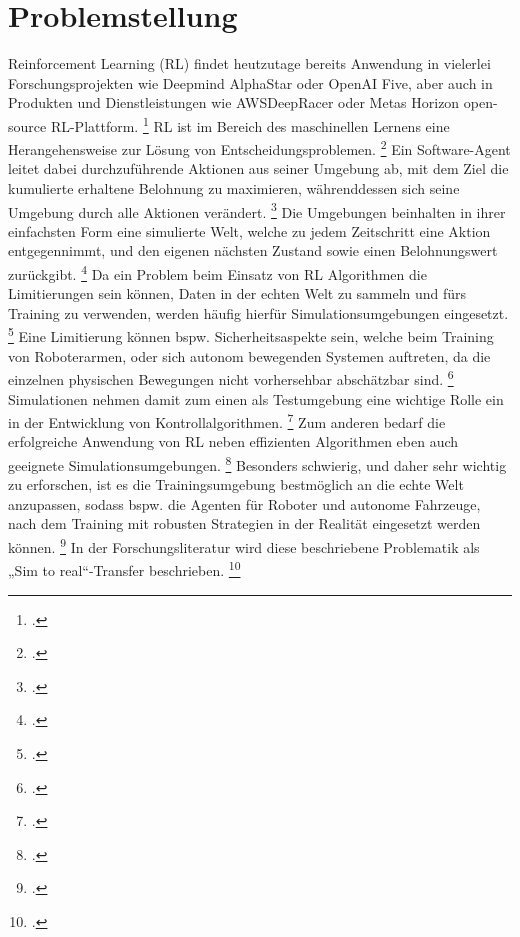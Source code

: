 \section{Problemstellung}

Reinforcement Learning (RL) findet heutzutage bereits Anwendung in vielerlei Forschungsprojekten wie Deepmind AlphaStar oder OpenAI Five, aber auch in Produkten und Dienstleistungen wie AWSDeepRacer oder Metas Horizon open-source RL-Plattform. \footcite[Vgl.][S. 4]{Li.2019}
RL ist im Bereich des maschinellen Lernens eine Herangehensweise zur Lösung von Entscheidungsproblemen. \footcite[Vgl.][S. 3]{Schuderer.2021}
Ein Software-Agent leitet dabei durchzuführende Aktionen aus seiner Umgebung ab, mit dem Ziel die kumulierte erhaltene Belohnung zu maximieren, währenddessen sich seine Umgebung durch alle Aktionen verändert. \footcite[Vgl.][S. 3]{Schuderer.2021}
Die Umgebungen beinhalten in ihrer einfachsten Form eine simulierte Welt, welche zu jedem Zeitschritt eine Aktion entgegennimmt, und den eigenen nächsten Zustand sowie einen Belohnungswert zurückgibt. \footcite[Vgl.][S. 1]{Reda.2020}
Da ein Problem beim Einsatz von RL Algorithmen die Limitierungen sein können, Daten in der echten Welt zu sammeln und fürs Training zu verwenden, werden häufig hierfür Simulationsumgebungen eingesetzt. \footcite[Vgl.][S. 737]{Zhao.2020}
Eine Limitierung können bspw. Sicherheitsaspekte sein, welche beim Training von Roboterarmen, oder sich autonom bewegenden Systemen auftreten, da die einzelnen physischen Bewegungen nicht vorhersehbar abschätzbar sind. \footcite[Vgl.][S. 738]{Zhao.2020}
Simulationen nehmen damit zum einen als Testumgebung eine wichtige Rolle ein in der Entwicklung von Kontrollalgorithmen. \footcite[Vgl.][S. 2]{Cutler.2014}
Zum anderen bedarf die erfolgreiche Anwendung von RL neben effizienten Algorithmen eben auch geeignete Simulationsumgebungen. \footcite[Vgl.][S. 8]{Reda.2020}
Besonders schwierig, und daher sehr wichtig zu erforschen, ist es die Trainingsumgebung bestmöglich an die echte Welt anzupassen, sodass bspw. die Agenten für Roboter und autonome Fahrzeuge, nach dem Training mit robusten Strategien in der Realität eingesetzt werden können. \footcite[Vgl.][S. 1]{DBLP:journals/corr/abs-1910-10537}
In der Forschungsliteratur wird diese beschriebene Problematik als „Sim to real“-Transfer beschrieben. \footcite[Vgl.][S. 738]{Zhao.2020}

